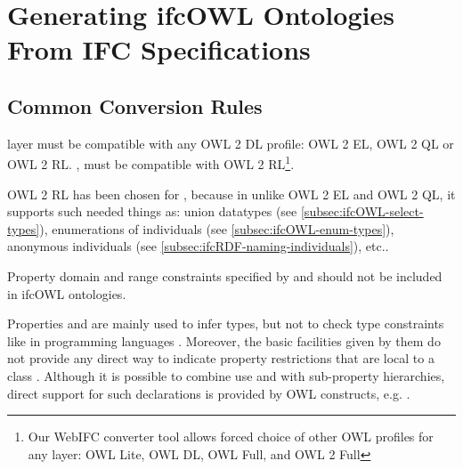 
\section{Generating ifcOWL Ontologies From IFC Specifications}
\label{sec:ifcOWL}

\subsection{Common Conversion Rules}

\begin{ontologyRule}
\ifclite{} layer must be compatible with any OWL 2 DL profile: OWL 2 EL, OWL 2 QL or OWL 2 RL. \ifcstandard{}, \ifcadvanced{} must be compatible with OWL 2 RL\footnote{Our WebIFC converter tool allows forced choice of other OWL profiles for any layer: OWL Lite, OWL DL, OWL Full, and OWL 2 Full}.
\end{ontologyRule}


OWL 2 RL has been chosen for \ifcstandard{}, \ifcadvanced{} because in unlike OWL 2 EL and OWL 2 QL, it supports such needed things as: union data\-types (see \ref{subsec:ifcOWL-select-types}), enumerations of individuals (see \ref{subsec:ifcOWL-enum-types}), anonymous individuals (see \ref{subsec:ifcRDF-naming-individuals}), etc.\cite{w3c:owl2-profiles}.

\begin{ontologyRule}
Property domain and range constraints specified by  and  should not be included in ifcOWL ontologies.
\end{ontologyRule}

Properties  and  are mainly used to infer types, but not to check type constraints like in programming languages \cite{w3c:owl-guide}. Moreover, the basic facilities given by them do not provide any direct way to indicate property restrictions that are local to a class \cite{w3c:rdf-schema}. Although it is possible to combine use  and  with sub-property hierarchies, direct support for such declarations is provided by OWL constructs, e.g. .

